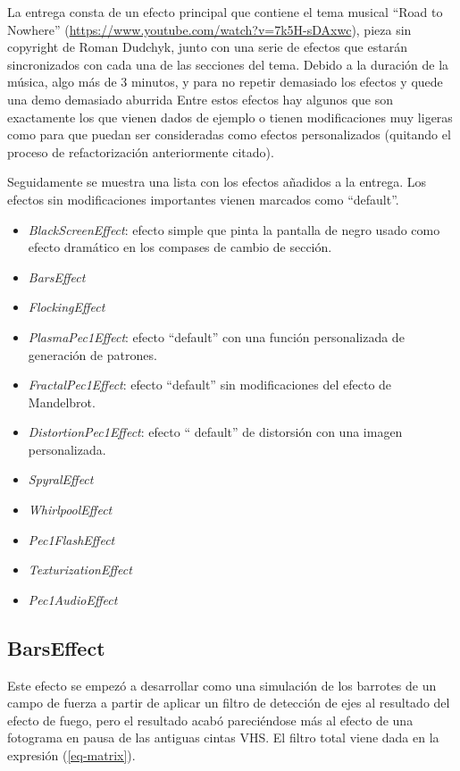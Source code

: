 \documentclass[12pt]{article}%
\begin{document}
	La entrega consta de un efecto principal que contiene el tema musical ``Road to Nowhere'' (\url{https://www.youtube.com/watch?v=7k5H-sDAxwc}), pieza sin copyright de Roman Dudchyk, junto con una serie de efectos que estarán sincronizados con cada una de las secciones del tema. Debido a la duración de la música, algo más de $3$ minutos, y para no repetir demasiado los efectos y quede una demo demasiado aburrida Entre estos efectos hay algunos que son exactamente los que vienen dados de ejemplo o tienen modificaciones muy ligeras como para que puedan ser consideradas como efectos personalizados (quitando el proceso de refactorización anteriormente citado).
	
	Seguidamente se muestra una lista con los efectos añadidos a la entrega. Los efectos sin modificaciones importantes vienen marcados como ``default''.
	
	\begin{itemize}
		\item \textit{BlackScreenEffect}: efecto simple que pinta la pantalla de negro usado como efecto dramático en los compases de cambio de sección.
		\item \textit{BarsEffect}
		\item \textit{FlockingEffect}
		\item \textit{PlasmaPec1Effect}: efecto ``default'' con una función personalizada de generación de patrones.
		\item \textit{FractalPec1Effect}: efecto ``default'' sin modificaciones del efecto de Mandelbrot.
		\item \textit{DistortionPec1Effect}: efecto `` default'' de distorsión con una imagen personalizada.
		\item \textit{SpyralEffect}
		\item \textit{WhirlpoolEffect}
		\item \textit{Pec1FlashEffect}
		\item \textit{TexturizationEffect}
		\item \textit{Pec1AudioEffect}
	\end{itemize}

\subsection{BarsEffect}
	Este efecto se empezó a desarrollar como una simulación de los barrotes de un campo de fuerza a partir de aplicar un filtro de detección de ejes al resultado del efecto de fuego, pero el resultado acabó pareciéndose más al efecto de una fotograma en pausa de las antiguas cintas VHS. El filtro total viene dada en la expresión (\ref{eq-matrix}).
	
\end{document}
